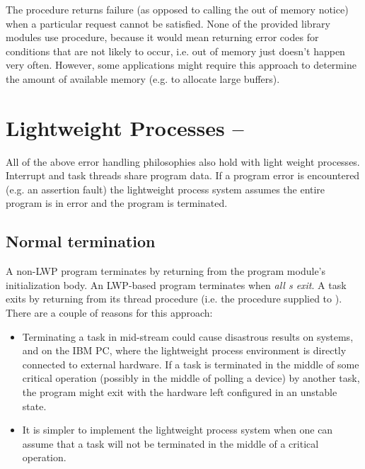 The procedure  returns failure (as opposed to
calling the out of memory notice) when a particular request cannot
be satisfied.  None of the provided library modules use procedure,
because it would mean returning error codes for conditions that are
not likely to occur, i.e. out of memory just doesn't happen very
often.  However, some applications might require this approach
to determine the amount of available memory (e.g. to allocate large
buffers).

\section{Lightweight Processes -- }

All of the above error handling philosophies also hold with 
light weight processes.  Interrupt and task threads share
program data.  If a program error is encountered (e.g. an
assertion fault) the lightweight process system assumes the
entire program is in error and the program is terminated.


\subsection{Normal termination}

A non-LWP program terminates by returning from the program module's
initialization body.  An LWP-based program terminates when
{\em all s exit}.
A task exits by returning from its thread procedure (i.e. the
procedure supplied to ).  There are a couple of
reasons for this approach:
\begin{itemize}
\item
    Terminating a task in mid-stream could cause disastrous
    results on systems, and on the IBM PC, where the lightweight process 
    environment
    is directly connected to external hardware.
    If a task is terminated in the middle of some critical operation
    (possibly in the middle of polling a device) by another task,
    the program might exit with the hardware left configured in an unstable
    state.
\item
    It is simpler to implement the lightweight process system when
    one can assume that a task will not be terminated in the middle
    of a critical operation.
\end{itemize}

